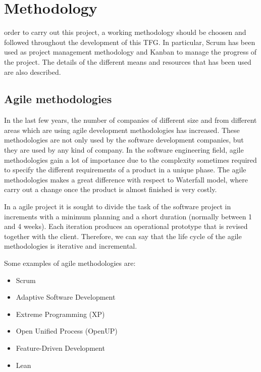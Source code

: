 \chapter{Methodology}
\label{chap:methodology}


 order to carry out this project, a working methodology should be choosen and followed throughout the development of this \ac{TFG}. In particular, Scrum has been used as project management methodology and Kanban to manage the progress of the project. The details of the different means and resources that has been used are also described.


\section{Agile methodologies}

In the last few years, the number of companies of different size and from different areas which are using agile development methodologies has increased. These methodologies are not only used by the software development companies, but they are used by any kind of company. In the software engineering field, agile methodologies gain a lot of importance due to the complexity sometimes required to specify the different requirements of a product in a unique phase. The agile methodologies makes a great difference with respect to Waterfall model, where carry out a change once the product is almost finished is very costly.

In a agile project it is sought to divide the task of the software project in increments with a minimum planning and a short duration (normally between 1 and 4 weeks). Each iteration produces an operational prototype that is revised together with the client. Therefore, we can say that the life cycle of the agile methodologies is iterative and incremental.

Some examples of agile methodologies are:
\begin{multicols}{2}
	\begin{itemize}
		\item Scrum
		\item Adaptive Software Development
		\item Extreme Programming (XP)
		\item Open Unified Process (OpenUP)
		\item Feature-Driven Development
		\item Lean
	\end{itemize}
\end{multicols}

